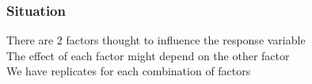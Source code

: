 \documentclass[color=usenames,dvipsnames]{beamer}\usepackage[]{graphicx}\usepackage[]{color}
\newcommand{\hlnum}[1]{\textcolor[rgb]{0.69,0.494,0}{#1}}%
\newcommand{\hlstr}[1]{\textcolor[rgb]{0.749,0.012,0.012}{#1}}%
\newcommand{\hlopt}[1]{\textcolor[rgb]{0,0,0}{#1}}%
\newcommand{\hlstd}[1]{\textcolor[rgb]{0,0,0}{#1}}%
\newcommand{\hlkwc}[1]{\textcolor[rgb]{0,0,0}{\textbf{#1}}}%
\newcommand{\hlkwd}[1]{\textcolor[rgb]{0.004,0.004,0.506}{#1}}%
\begin{document}
\begin{comment}
\begin{verbatim}
##             Df Sum Sq Mean Sq F value   Pr(>F)    
## precip       1   44.1    44.1   9.303  0.00387 ** 
## temp         1  736.3   736.3 155.389 4.92e-16 ***
## precip:temp  1  352.1   352.1  74.301 5.29e-11 ***
## Residuals   44  208.5     4.7                     
## ---
## Signif. codes:  0 '***' 0.001 '**' 0.01 '*' 0.05 '.' 0.1 ' ' 1
\end{verbatim}
\begin{alltt}
\hlkwd{summary}\hlstd{(}\hlkwd{aov}\hlstd{(species} \hlopt{~} \hlstd{precip}\hlopt{+}\hlstd{temp, richness))}
\end{alltt}
\begin{verbatim}
##             Df Sum Sq Mean Sq F value   Pr(>F)    
## precip       1   44.1    44.1   3.539   0.0664 .  
## temp         1  736.3   736.3  59.108 9.84e-10 ***
## Residuals   45  560.6    12.5                     
## ---
## Signif. codes:  0 '***' 0.001 '**' 0.01 '*' 0.05 '.' 0.1 ' ' 1
\end{verbatim}
\begin{alltt}
\hlkwd{write.csv}\hlstd{(richness,} \hlstr{"speciesRichness.csv"}\hlstd{,} \hlkwc{row.names}\hlstd{=}\hlnum{FALSE}\hlstd{)}
\end{alltt}
\end{kframe}
\end{knitrout}
\end{frame}
\end{comment}



\begin{frame}
  \frametitle{Situation}
  There are 2 factors thought to influence the response variable \\
  \pause
  \vfill
  The effect of each factor might depend on the other factor \\
  \pause
  \vfill
  We have replicates for each \alert{combination} of factors \\
\end{frame}


\end{document}
